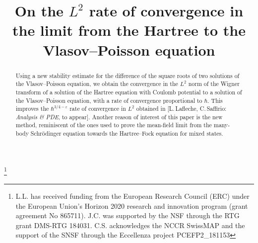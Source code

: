 \documentclass[JEP,XML,SOM,Unicode,NoEqCountersInSection,published]{cedram}
\theoremstyle{definition}
\renewcommand {\(} {\lt(}
\renewcommand {\)} {\rt)}
\begin{document}
\title[On the $L^2$ rate of convergence]{On the $L^2$ rate of convergence in the limit from the Hartree to the Vlasov--Poisson equation}

\author[\initial{J.} \lastname{Chong}]{  }
\address{Department of Mathematics, The University of Texas at Austin\\ Austin, TX 78712, USA\\
\& Department of Mathematics, School of Mathematical Sciences, Peking University\\
Beijing, China}

\author[\initial{L.} \lastname{Lafleche}]{ }
\address{Department of Mathematics, The University of Texas at Austin\\ Austin, TX 78712, USA\\
\& Institut Camille Jordan, CNRS, Université Claude Bernard Lyon 1\\
43 boulevard du 11 novembre 1918, F-69622 Villeurbanne Cedex, France}

\author[\initial{C.} \lastname{Saffirio}]{ }
\address{Department of Mathematics and Computer Science, University of Basel\\
4051 Basel, Switzerland}
\urladdr{}

\thanks{L.L. has received funding from the European Research Council (ERC) under the European Union’s Horizon 2020 research and innovation program (grant agreement No 865711). J.C. was supported by the NSF through the RTG grant DMS-RTG 184031. C.S. acknowledges the NCCR SwissMAP and the support of the SNSF through the Eccellenza project PCEFP2\_181153}



\begin{abstract}
Using a new stability estimate for the difference of the square roots of two solutions of the Vlasov--Poisson equation, we obtain the convergence in the $L^2$ norm of the Wigner transform of a solution of the Hartree equation with Coulomb potential to a solution of the Vlasov--Poisson equation, with a rate of convergence proportional to $\hbar$. This improves the $\hbar^{3/4-\varepsilon}$ rate of convergence in $L^2$ obtained in [L.\,Lafleche, C.\,Saffirio: \textit{Analysis \& PDE}, to appear]. Another reason of interest of this paper is the new method, reminiscent of the ones used to prove the mean-field limit from the many-body Schrödinger equation towards the Hartree--Fock equation for mixed states.
\end{abstract}
\end{document}
